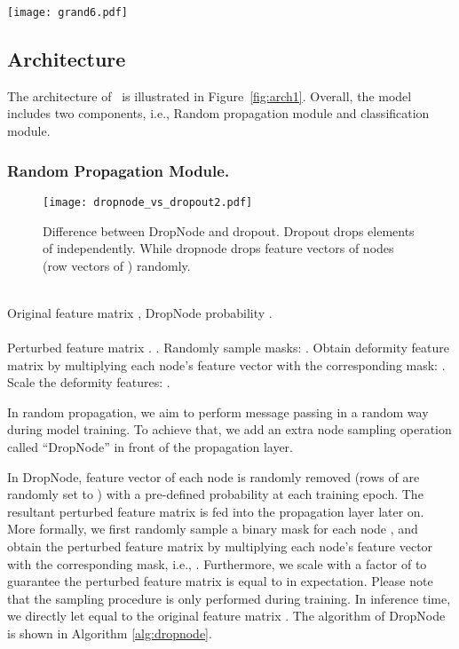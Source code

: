 {\begin{figure*}
    \centering
    \texttt{[image: grand6.pdf]}
    \caption{Architecture of \model.}
    \label{fig:arch1}
\end{figure*}

\subsection{Architecture}
The architecture of \model\ is illustrated in Figure~\ref{fig:arch1}. Overall, the model includes two components, i.e., Random propagation module and classification module.


\subsubsection{Random Propagation Module.}
\label{sec:randpro}
\begin{figure}
    \centering
    \texttt{[image: dropnode\_vs\_dropout2.pdf]}
    \caption{Difference between DropNode and dropout. Dropout drops  elements of  independently. While dropnode drops feature vectors of nodes (row vectors of ) randomly.}
    \label{fig:dropnode_vs_dropout}
\end{figure}



\begin{algorithm}[tb]
\caption{Dropnode}
\label{alg:dropnode}
\begin{algorithmic}[1] 
\REQUIRE ~~\\
Original feature matrix , DropNode probability 
. \\
\ENSURE ~~\\
Perturbed feature matrix  .
\STATE .
\ELSE
\STATE Randomly sample  masks: .
\STATE Obtain deformity feature matrix by  multiplying each node's feature vector with the corresponding  mask: .
\STATE Scale the deformity features: .
\ENDIF
\end{algorithmic}
\end{algorithm}

\label{sec:randpro}


In random propagation, we aim to perform message passing in a random way during model training. To achieve that, we add an extra node sampling operation called ``DropNode'' in front of the propagation layer.


 In DropNode, feature vector of each node is randomly removed (rows of  are randomly set to ) with a pre-defined probability  at each training epoch. The resultant perturbed feature matrix  is fed into the propagation layer later on.
More formally, we first randomly sample a binary mask  for each node , and obtain the perturbed feature matrix  by multiplying each node's feature vector with the corresponding mask, i.e., . Furthermore, we scale  with a factor of  to guarantee the perturbed feature matrix is equal to  in expectation. Please note that the sampling procedure is only performed during training. In inference time, we directly let  equal to the original feature matrix . The algorithm of DropNode is shown in Algorithm \ref{alg:dropnode}. 

}
